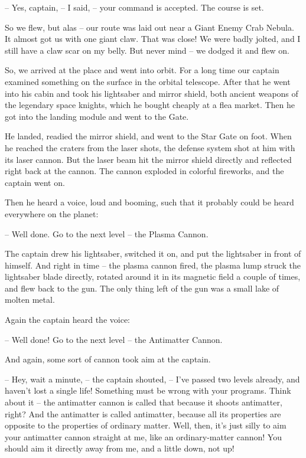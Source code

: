 \documentclass[ebook,twoside,final,openright]{memoir}
\begin{document}
– Yes, captain, – I said, – your command is accepted. The course is set.\par
So we flew, but alas – our route was laid out near a Giant Enemy Crab Nebula. It almost got us with one giant claw. That was close! We were badly jolted, and I still have a claw scar on my belly. But never mind – we dodged it and flew on. \par
\par
So, we arrived at the place and went into orbit. For a long time our captain examined something on the surface in the orbital telescope. After that he went into his cabin and took his lightsaber and mirror shield, both ancient weapons of the legendary space knights, which he bought cheaply at a flea market. Then he got into the landing module and went to the Gate.\par
\par
He landed, readied the mirror shield, and went to the Star Gate on foot. When he reached the craters from the laser shots, the defense system shot at him with its laser cannon. But the laser beam hit the mirror shield directly and reflected right back at the cannon. The cannon exploded in colorful fireworks, and the captain went on.\par
\par
Then he heard a voice, loud and booming, such that it probably could be heard everywhere on the planet:\par
– Well done. Go to the next level – the Plasma Cannon.\par
The captain drew his lightsaber, switched it on, and put the lightsaber in front of himself. And right in time – the plasma cannon fired, the plasma lump struck the lightsaber blade directly, rotated around it in its magnetic field a couple of times, and flew back to the gun. The only thing left of the gun was a small lake of molten metal.\par
\par
Again the captain heard the voice:\par
– Well done! Go to the next level – the Antimatter Cannon.\par
And again, some sort of cannon took aim at the captain.\par
– Hey, wait a minute, – the captain shouted, – I’ve passed two levels already, and haven’t lost a single life! Something must be wrong with your programs. Think about it – the antimatter cannon is called that because it shoots antimatter, right? And the antimatter is called antimatter, because all its properties are opposite to the properties of ordinary matter. Well, then, it’s just silly to aim your antimatter cannon straight at me, like an ordinary-matter cannon! You should aim it directly away from me, and a little down, not up!\par
\end{document}
